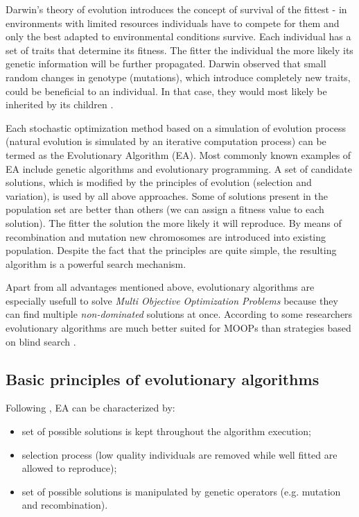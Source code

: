 Darwin's theory of evolution introduces the concept of survival of the fittest - in environments with limited resources individuals have to compete for them and
only the best adapted to environmental conditions survive.
Each individual has a set of traits that determine its fitness.
The fitter the individual the more likely its genetic information will be further propagated.
Darwin observed that small random changes in genotype (mutations), which introduce completely new traits, could be beneficial to an individual.
In that case, they would most likely be inherited by its children \cite{evo}.


Each stochastic optimization method based on a simulation of evolution process (natural evolution is simulated by an iterative computation process)
can be termed as the Evolutionary Algorithm (EA).
Most commonly known examples of EA include genetic algorithms and evolutionary programming.
A set of candidate solutions, which is modified by the principles of evolution (selection and variation), is used by all above approaches.
Some of solutions present in the population set are better than others (we can assign a fitness value to each solution).
The fitter the solution the more likely it will reproduce.
By means of recombination and mutation new chromosomes are introduced into existing population.
Despite the fact that the principles are quite simple, the resulting algorithm is a powerful search mechanism.  

Apart from all advantages mentioned above, evolutionary algorithms are especially usefull to solve \emph{Multi Objective Optimization Problems} because they
can find multiple \emph{non-dominated} solutions at once. 
According to some researchers evolutionary algorithms are much better suited for MOOPs than strategies based on blind search \cite{Phd}.

\subsection{Basic principles of evolutionary algorithms}

Following \cite{Phd}, EA can be characterized by:

\begin{itemize}
  \item set of possible solutions is kept throughout the algorithm execution;
  \item selection process (low quality individuals are removed while well fitted are allowed to reproduce);
  \item set of possible solutions is manipulated by genetic operators (e.g. mutation and recombination).
\end{itemize}

